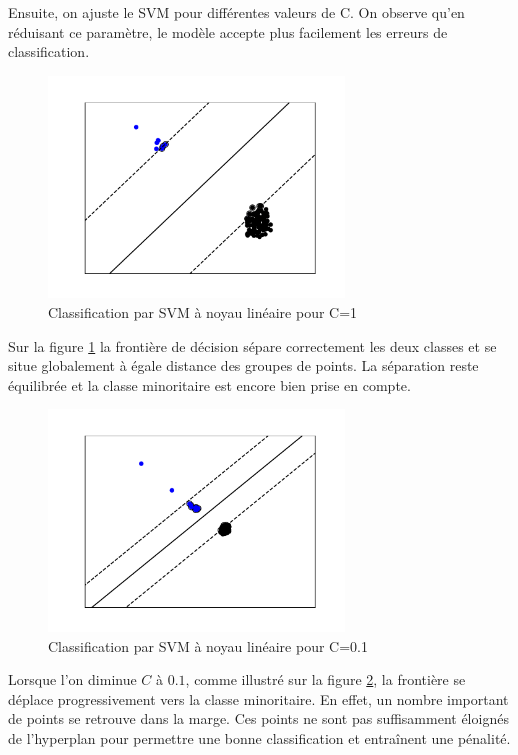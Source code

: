 \documentclass[a4paper,12pt]{article}
\begin{document}
Ensuite, on ajuste le SVM pour différentes valeurs de C. On observe qu'en réduisant ce paramètre, le modèle accepte plus facilement les erreurs de classification.

\begin{figure}[H] 
    \centering
        \includegraphics[width=0.7\textwidth]{images/fitC1.pdf} 
        \caption{Classification par SVM à noyau linéaire pour C=1}
    \label{fig:fitC1}
\end{figure}

Sur la figure \ref{fig:fitC1} la frontière de décision sépare correctement les deux classes et se situe globalement à égale distance des groupes de points. La séparation reste équilibrée et la classe minoritaire est encore bien prise en compte.

\begin{figure}[H] 
    \centering
    \includegraphics[width=0.7\textwidth]{images/fitC01.pdf} 
    \caption{Classification par SVM à noyau linéaire pour C=0.1}
    \label{fig:fitC01}
\end{figure}

Lorsque l’on diminue $C$ à $0.1$, comme illustré sur la figure \ref{fig:fitC01}, la frontière se déplace progressivement vers la classe minoritaire. En effet, un nombre important de points se retrouve dans la marge. Ces points ne sont pas suffisamment éloignés de l’hyperplan pour permettre une bonne classification et entraînent une pénalité.
\end{document}
